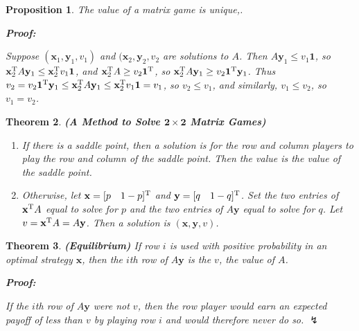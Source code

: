 \documentclass{article}
\theoremstyle{colontheorem}
\newtheorem{theorem}{Theorem}[section]
\newtheorem{proposition}[theorem]{Proposition}
\newcommand{\T}{^\textnormal{T}}
\newenvironment{Theorem}
{
	\begin{mdframed}[backgroundcolor=TheoremOrange!10]
	\begin{theorem}
}
{
	\end{theorem}
	\end{mdframed}
	
	\vspace{.15in}
}
\newenvironment{Proposition}
{
	\begin{mdframed}[backgroundcolor=PropPink!10]
	\begin{proposition}
}
{
	\end{proposition}
	\end{mdframed}
	
	\vspace{.15in}
}
\newenvironment{Proof}
{
	\begin{mdframed}[backgroundcolor=ProofPurple!10]
	\textbf{Proof:}%
}
{
	\end{mdframed}
	
	\vspace{.085in}
}
\begin{document}
\begin{Proposition}
	
	The value of a matrix game is unique,.
	
	\begin{Proof}
		Suppose $(\mathbf{x}_1, \mathbf{y}_1, v_1)$ and $(\mathbf{x}_2, \mathbf{y}_2, v_2$ are solutions to $A$. Then $A \mathbf{y}_1 \leq v_1 \mathbf{1}$, so $\mathbf{x}_2\T A \mathbf{y}_1 \leq \mathbf{x}_2\T v_1 \mathbf{1}$, and $\mathbf{x}_2\T A \geq v_2 \mathbf{1}\T$, so $\mathbf{x}_2\T A \mathbf{y}_1 \geq v_2 \mathbf{1}\T \mathbf{y}_1$. Thus $v_2 = v_2 \mathbf{1}\T \mathbf{y}_1 \leq \mathbf{x}_2\T A \mathbf{y}_1 \leq \mathbf{x}_2\T v_1 \mathbf{1} = v_1$, so $v_2 \leq v_1$, and similarly, $v_1 \leq v_2$, so $v_1 = v_2$.
		
	\end{Proof}
	
\end{Proposition}



\begin{Theorem}
	
	\textbf{(A Method to Solve $\mathbf{2 \times 2}$ Matrix Games)}
	
	\begin{enumerate}
		
		\item If there is a saddle point, then a solution is for the row and column players to play the row and column of the saddle point. Then the value is the value of the saddle point.
		
		\item Otherwise, let $\mathbf{x} = [p\ \ \ 1-p]\T$ and $\mathbf{y} = [q\ \ \ 1-q]\T$. Set the two entries of $\mathbf{x}\T A$ equal to solve for $p$ and the two entries of $A \mathbf{y}$ equal to solve for $q$. Let $v = \mathbf{x}\T A = A \mathbf{y}$. Then a solution is $(\mathbf{x}, \mathbf{y}, v)$.
		
	\end{enumerate}
	
\end{Theorem}



\begin{Theorem}
	
	\textbf{(Equilibrium)} If row $i$ is used with positive probability in an optimal strategy $\mathbf{x}$, then the $i$th row of $A\mathbf{y}$ is the $v$, the value of $A$.
	
	\begin{Proof}
		If the $i$th row of $A\mathbf{y}$ were not $v$, then the row player would earn an expected payoff of less than $v$ by playing row $i$ and would therefore never do so. $\lightning$
		
	\end{Proof}
	
\end{Theorem}
\end{document}
